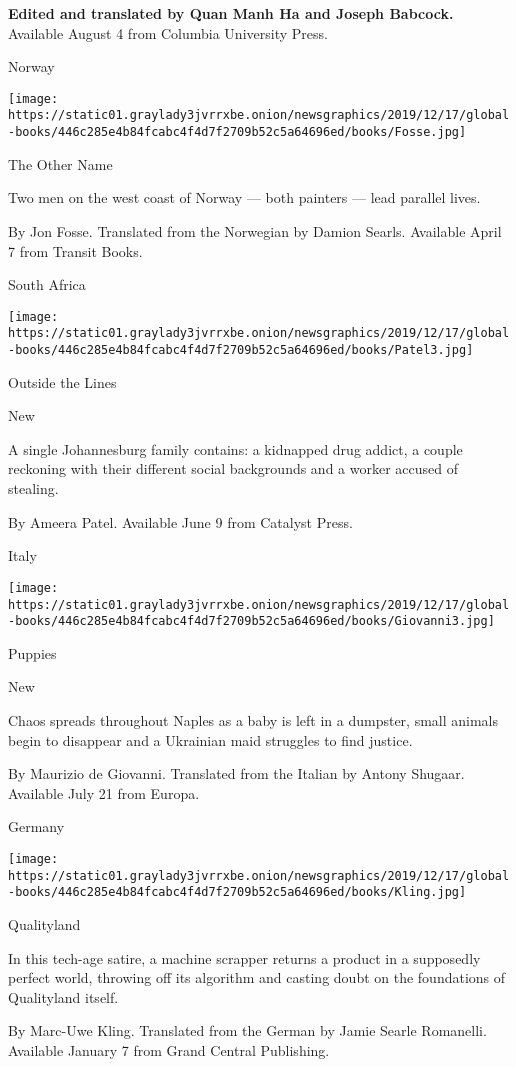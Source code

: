  \textbf{Edited and translated by Quan Manh Ha and Joseph Babcock.}
Available August 4 from Columbia University Press.

Norway

\texttt{[image: https://static01.graylady3jvrrxbe.onion/newsgraphics/2019/12/17/global-books/446c285e4b84fcabc4f4d7f2709b52c5a64696ed/books/Fosse.jpg]}

The Other Name

Two men on the west coast of Norway --- both painters --- lead parallel
lives.

 By Jon Fosse. Translated from the Norwegian by Damion Searls. Available
April 7 from Transit Books.

South Africa

\texttt{[image: https://static01.graylady3jvrrxbe.onion/newsgraphics/2019/12/17/global-books/446c285e4b84fcabc4f4d7f2709b52c5a64696ed/books/Patel3.jpg]}

Outside the Lines

New

A single Johannesburg family contains: a kidnapped drug addict, a couple
reckoning with their different social backgrounds and a worker accused
of stealing.

 By Ameera Patel. Available June 9 from Catalyst Press.

Italy

\texttt{[image: https://static01.graylady3jvrrxbe.onion/newsgraphics/2019/12/17/global-books/446c285e4b84fcabc4f4d7f2709b52c5a64696ed/books/Giovanni3.jpg]}

Puppies

New

Chaos spreads throughout Naples as a baby is left in a dumpster, small
animals begin to disappear and a Ukrainian maid struggles to find
justice.

 By Maurizio de Giovanni. Translated from the Italian by Antony Shugaar.
Available July 21 from Europa.

Germany

\texttt{[image: https://static01.graylady3jvrrxbe.onion/newsgraphics/2019/12/17/global-books/446c285e4b84fcabc4f4d7f2709b52c5a64696ed/books/Kling.jpg]}

Qualityland

In this tech-age satire, a machine scrapper returns a product in a
supposedly perfect world, throwing off its algorithm and casting doubt
on the foundations of Qualityland itself.

 By Marc-Uwe Kling. Translated from the German by Jamie Searle
Romanelli. Available January 7 from Grand Central Publishing.

